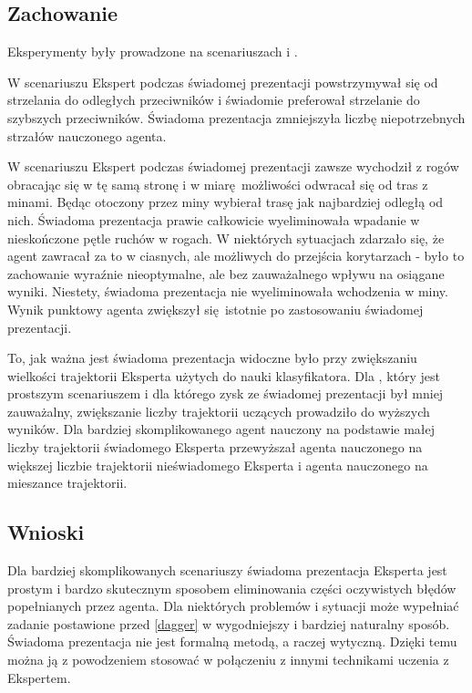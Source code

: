 \subsection{Zachowanie}
Eksperymenty były prowadzone na scenariuszach  i .

W scenariuszu  Ekspert podczas świadomej prezentacji powstrzymywał się od strzelania do odległych przeciwników i świadomie preferował strzelanie do szybszych przeciwników. Świadoma prezentacja zmniejszyła liczbę niepotrzebnych strzałów nauczonego agenta.

W scenariuszu  Ekspert podczas świadomej prezentacji zawsze wychodził z rogów obracając się w tę samą stronę i w miarę możliwości odwracał się od tras z minami. Będąc otoczony przez miny wybierał trasę jak najbardziej odległą od nich. Świadoma prezentacja prawie całkowicie wyeliminowała wpadanie w nieskończone pętle ruchów w rogach. W niektórych sytuacjach zdarzało się, że agent zawracał za to w ciasnych, ale możliwych do przejścia korytarzach - było to zachowanie wyraźnie nieoptymalne, ale bez zauważalnego wpływu na osiągane wyniki. Niestety, świadoma prezentacja nie wyeliminowała wchodzenia w miny. Wynik punktowy agenta zwiększył się istotnie po zastosowaniu świadomej prezentacji.

To, jak ważna jest świadoma prezentacja widoczne było przy zwiększaniu wielkości trajektorii Eksperta użytych do nauki klasyfikatora. Dla , który jest prostszym scenariuszem i dla którego zysk ze świadomej prezentacji był mniej zauważalny, zwiększanie liczby trajektorii uczących prowadziło do wyższych wyników. Dla bardziej skomplikowanego  agent nauczony na podstawie małej liczby trajektorii świadomego Eksperta przewyższał agenta nauczonego na większej liczbie trajektorii nieświadomego Eksperta i agenta nauczonego na mieszance trajektorii. 
 
\subsection{Wnioski}

Dla bardziej skomplikowanych scenariuszy świadoma prezentacja Eksperta jest prostym i bardzo skutecznym sposobem eliminowania części oczywistych błędów popełnianych przez agenta. Dla niektórych problemów i sytuacji może wypełniać zadanie postawione przed \ref{dagger} w wygodniejszy i bardziej naturalny sposób.
Świadoma prezentacja nie jest formalną metodą, a raczej wytyczną. Dzięki temu można ją z powodzeniem stosować w połączeniu z innymi technikami uczenia z Ekspertem.
